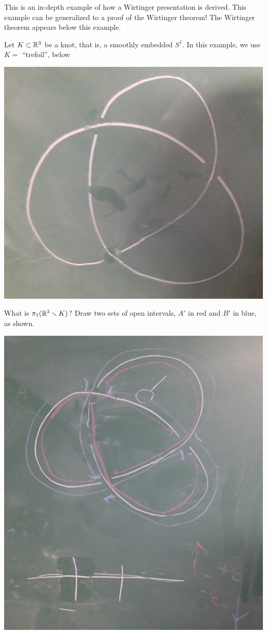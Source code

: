 \documentclass[11pt,leqno,oneside]{amsart}
\numberwithin{thm}{section}
\newcommand{\minus}{\smallsetminus}
\newcommand{\fund}{\pi_1}
\begin{document}
\begin{example}
  This is an in-depth example of how a Wirtinger presentation is
  derived.  This example can be generalized to a proof of the
  Wirtinger theorem!  The Wirtinger theorem appears below this
  example.

  Let $K \subset {\mathbb R}^3$ be a knot, that is, a smoothly embedded $S^1$.
  In this example, we use $K =$ ``trefoil'', below

  \includegraphics[scale=0.15]{images/trefoil.jpg}

  What is $\fund(\R^3\minus K)$?  Draw two sets of open intervals,
  $A'$ in red and $B'$ in blue, as shown.

  \includegraphics[scale=0.2]{images/trefoil-with-red-and-blue.jpg}


\end{example}
\end{document}

